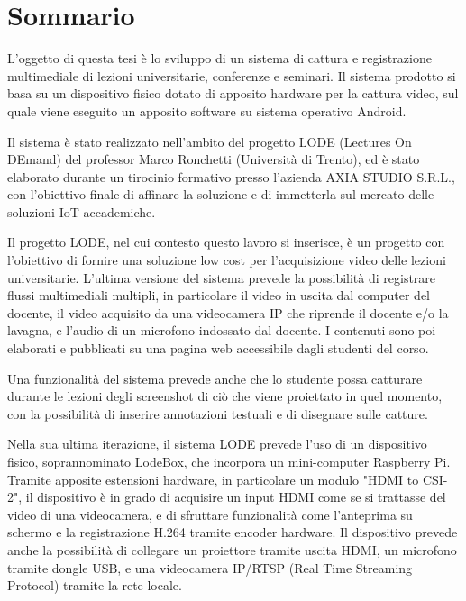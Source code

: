 \chapter*{Sommario} %
\label{sommario}


L'oggetto di questa tesi è lo sviluppo di un sistema di cattura e registrazione multimediale di lezioni universitarie, conferenze e seminari. Il sistema prodotto si basa su un dispositivo fisico dotato di apposito hardware per la cattura video, sul quale viene eseguito un apposito software su sistema operativo Android.

Il sistema è stato realizzato nell'ambito del progetto LODE (Lectures On DEmand) del professor Marco Ronchetti (Università di Trento), ed è stato elaborato durante un tirocinio formativo presso l'azienda AXIA STUDIO S.R.L., con l'obiettivo finale di affinare la soluzione e di immetterla sul mercato delle soluzioni IoT accademiche.

Il progetto LODE, nel cui contesto questo lavoro si inserisce, è un progetto con l'obiettivo di fornire una soluzione low cost per l'acquisizione video delle lezioni universitarie. L'ultima versione del sistema prevede la possibilità di registrare flussi multimediali multipli, in particolare il video in uscita dal computer del docente, il video acquisito da una videocamera IP che riprende il docente e/o la lavagna, e l'audio di un microfono indossato dal docente. I contenuti sono poi elaborati e pubblicati su una pagina web accessibile dagli studenti del corso.

Una funzionalità del sistema prevede anche che lo studente possa catturare durante le lezioni degli screenshot di ciò che viene proiettato in quel momento, con la possibilità di inserire annotazioni testuali e di disegnare sulle catture.

Nella sua ultima iterazione, il sistema LODE prevede l'uso di un dispositivo fisico, soprannominato LodeBox, che incorpora un mini-computer Raspberry Pi. Tramite apposite estensioni hardware, in particolare un modulo "HDMI to CSI-2", il dispositivo è in grado di acquisire un input HDMI come se si trattasse del video di una videocamera, e di sfruttare funzionalità come l'anteprima su schermo e la registrazione H.264 tramite encoder hardware. Il dispositivo prevede anche la possibilità di collegare un proiettore tramite uscita HDMI, un microfono tramite dongle USB, e una videocamera IP/RTSP (Real Time Streaming Protocol) tramite la rete locale.

